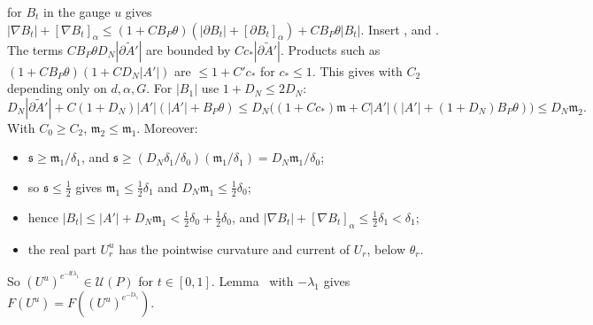 \begin{detail}
\begin{step}
 for $B_t$ in the gauge $u$ gives $|\nabla B_t|+[\nabla B_t]_\alpha\le(1+CB_P\theta)(|\partial B_t|+[\partial B_t]_\alpha)+CB_P\theta|B_t|$. Insert ,  and . The terms $CB_P\theta D_N|\partial\tilde A'|$ are bounded by $Cc_*|\partial\tilde A'|$. Products such as $(1+CB_P\theta)(1+CD_N|A'|)$ are $\le1+C'c_*$ for $c_*\le1$. This gives  with $C_2$ depending only on $d,\alpha,G$. For $|B_1|$ use $1+D_N\le2D_N$:
\[
D_N|\partial\tilde A'|+C(1+D_N)|A'|(|A'|+B_P\theta)\le D_N\big((1+Cc_*)\mathfrak m+C|A'|(|A'|+(1+D_N)B_P\theta)\big)\le D_N\mathfrak m_2 .
\]
With $C_0\ge C_2$, $\mathfrak m_2\le\mathfrak m_1$. Moreover:
\begin{itemize}
\item $\mathfrak s\ge\mathfrak m_1/\delta_1$, and $\mathfrak s\ge(D_N\delta_1/\delta_0)(\mathfrak m_1/\delta_1)=D_N\mathfrak m_1/\delta_0$;
\item so $\mathfrak s\le\frac12$ gives $\mathfrak m_1\le\frac12\delta_1$ and $D_N\mathfrak m_1\le\frac12\delta_0$;
\item hence $|B_t|\le|A'|+D_N\mathfrak m_1<\frac12\delta_0+\frac12\delta_0$, and $|\nabla B_t|+[\nabla B_t]_\alpha\le\frac12\delta_1<\delta_1$;
\item the real part $U_r^u$ has the pointwise curvature and current of $U_r$, below $\theta_r$.
\end{itemize}
So $(U^u)^{e^{-\ii t\lambda_1}}\in\mathcal U(P)$ for $t\in[0,1]$. Lemma~ with $-\lambda_1$ gives $F(U^u)=F((U^u)^{e^{-\ii\lambda_1}})$.
\end{step}


\end{detail}
